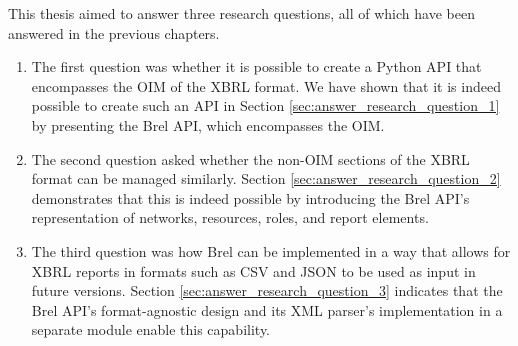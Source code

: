 This thesis aimed to answer three research questions, all of which have been answered in the previous chapters.

\begin{enumerate}
    \item The first question was whether it is possible to create a Python API that encompasses the OIM of the XBRL format.
    We have shown that it is indeed possible to create such an API in Section \ref{sec:answer_research_question_1}
    by presenting the Brel API, which encompasses the OIM.
    \item The second question asked whether the non-OIM sections of the XBRL format can be managed similarly.
    Section \ref{sec:answer_research_question_2} demonstrates that this is indeed possible
    by introducing the Brel API's representation of networks, resources, roles, and report elements.
    \item The third question was how Brel can be implemented in a way that allows for XBRL reports in
    formats such as CSV and JSON to be used as input in future versions.
    Section \ref{sec:answer_research_question_3} indicates that the Brel API's format-agnostic design
    and its XML parser's implementation in a separate module enable this capability.
\end{enumerate}

